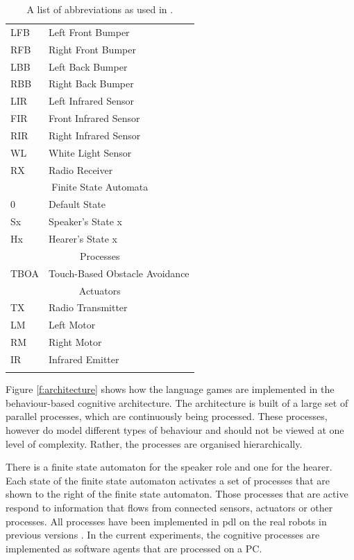 \begin{table}
\centering
\begin{tabular}{ll}
\lsptoprule
\multicolumn{2}{c}{{\sc Sensors}}\\
\midrule
LFB & Left Front Bumper\\
RFB & Right Front Bumper\\
LBB & Left Back Bumper\\
RBB & Right Back Bumper\\
LIR & Left Infrared Sensor\\
FIR & Front Infrared Sensor\\
RIR & Right Infrared Sensor\\
WL & White Light Sensor\\
RX & Radio Receiver\\
\midrule
\multicolumn{2}{c}{{\sc Finite State Automata}}\\
\midrule
0 & Default State\\
Sx & Speaker's State x\\
Hx & Hearer's State x\\
\midrule
\multicolumn{2}{c}{{\sc Processes}}\\
\midrule
TBOA & Touch-Based Obstacle Avoidance\\
\midrule
\multicolumn{2}{c}{{\sc Actuators}}\\
\midrule
TX & Radio Transmitter\\
LM & Left Motor\\
RM & Right Motor\\
IR & Infrared Emitter\\
\lspbottomrule
\end{tabular}
\caption{A list of abbreviations as used in .}
\label{t:abbr}
\end{table}


Figure \ref{f:architecture} shows how the language games are implemented in the behaviour-based cognitive architecture. The architecture is built of a large set of parallel processes, which are continuously being processed. These processes, however do model different types of behaviour and should not be viewed at one level of complexity. Rather, the processes are organised hierarchically. 

There is a finite state automaton for the speaker role and one for the hearer. Each state of the finite state automaton activates a set of processes that are shown to the right of the finite state automaton. Those processes that are active respond to information that flows from connected sensors, actuators or other processes. All processes have been implemented in {\sc pdl} on the real robots in previous versions \citep{steelsvogt:1997}. In the current experiments, the cognitive processes are implemented as software agents that are processed on a PC.

